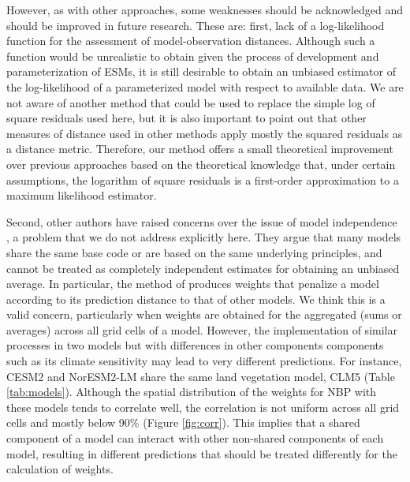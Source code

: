 \documentclass[gmd, manuscript]{copernicus}
\begin{document}
However, as with other approaches, some weaknesses should be acknowledged and should be improved in future research. These are: first, lack of a log-likelihood function for the assessment of model-observation distances. Although such a function would be unrealistic to obtain given the process of development and parameterization of ESMs, it is still desirable to obtain an unbiased estimator of the log-likelihood of a parameterized model with respect to available data. We are not aware of another method that could be used to replace the simple log of square residuals used here, but it is also important to point out that other measures of distance used in other methods apply mostly the squared residuals as a distance metric. Therefore, our method offers a small theoretical improvement over previous approaches based on the theoretical knowledge that, under certain assumptions, the logarithm of square residuals is a first-order approximation to a maximum likelihood estimator. 

Second, other authors have raised concerns over the issue of model independence \citep{Knutti2010CC, Knutti2010JC}, a problem that we do not address explicitly here. They argue that many models share the same base code or are based on the same underlying principles, and cannot be treated as completely independent estimates for obtaining an unbiased average. In particular, the method of \citet{Knutti2017} produces weights that penalize a model according to its prediction distance to that of other models. We think this is a valid concern, particularly when weights are obtained for the aggregated (sums or averages) across all grid cells of a model. However, the implementation of similar processes in two models but with differences in other components components such as its climate sensitivity may lead to very different predictions. For instance, CESM2 and NorESM2-LM share the same land vegetation model, CLM5 (Table \ref{tab:models}). Although the spatial distribution of the weights for NBP with these models tends to correlate well, the correlation is not uniform across all grid cells and mostly below 90\% (Figure \ref{fig:corr}). This implies that a shared component of a model can interact with other non-shared components of each model, resulting in different predictions that should be treated differently for the calculation of weights. 
\end{document}
